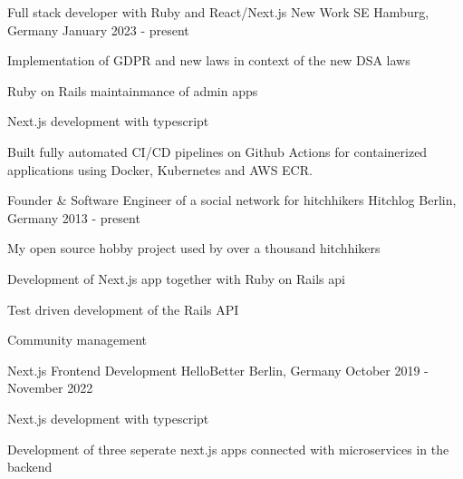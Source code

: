 

\begin{cventries}
  \cventry
    {Full stack developer with Ruby and React/Next.js} %
    {New Work SE} %
    {Hamburg, Germany} %
    {January 2023 - present} %
    {
      \begin{cvitems} %
        \item {Implementation of GDPR and new laws in context of the new DSA laws}
        \item {Ruby on Rails maintainmance of admin apps}
        \item {Next.js development with typescript}
        \item {Built fully automated CI/CD pipelines on Github Actions for containerized applications using Docker, Kubernetes and AWS ECR.}
      \end{cvitems}
    }

  \cventry
    {Founder & Software Engineer of a social network for hitchhikers} %
    {Hitchlog} %
    {Berlin, Germany} %
    {2013 - present} %
    {
      \begin{cvitems} %
        \item {My open source hobby project used by over a thousand hitchhikers}
        \item {Development of Next.js app together with Ruby on Rails api}
        \item {Test driven development of the Rails API}
        \item {Community management}
      \end{cvitems}
    }

  \cventry
    {Next.js Frontend Development} %
    {HelloBetter} %
    {Berlin, Germany} %
    {October 2019 - November 2022} %
    {
      \begin{cvitems} %
        \item {Next.js development with typescript}
        \item {Development of three seperate next.js apps connected with microservices in the backend}
      \end{cvitems}
    }


\end{cventries}
